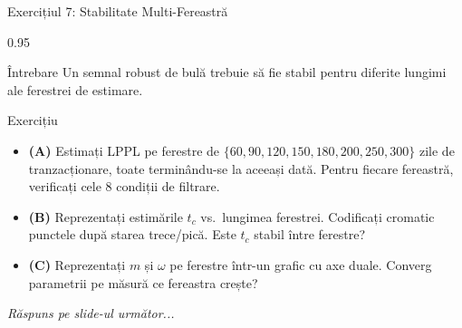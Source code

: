 \documentclass[9pt, aspectratio=169, t]{beamer}
\begin{document}
\begin{frame}{Exercițiul 7: Stabilitate Multi-Fereastră}
    \begin{cminipage}{0.95\textwidth}
    \begin{alertblock}{Întrebare}
        Un semnal robust de bulă trebuie să fie stabil pentru diferite lungimi ale ferestrei de estimare.
    \end{alertblock}

    \vspace{0.2cm}

    \begin{block}{Exercițiu}
        \begin{itemize}\setlength{\itemsep}{3pt}
            \item \textcolor{MainBlue}{\textbf{(A)}} Estimați LPPL pe ferestre de $\{60, 90, 120, 150, 180, 200, 250, 300\}$ zile de tranzacționare, toate terminându-se la aceeași dată. Pentru fiecare fereastră, verificați cele 8 condiții de filtrare.
            \item \textcolor{MainBlue}{\textbf{(B)}} Reprezentați estimările $t_c$ vs.\ lungimea ferestrei. Codificați cromatic punctele după starea trece/pică. Este $t_c$ stabil între ferestre?
            \item \textcolor{MainBlue}{\textbf{(C)}} Reprezentați $m$ și $\omega$ pe ferestre într-un grafic cu axe duale. Converg parametrii pe măsură ce fereastra crește?
        \end{itemize}
    \end{block}

    \vspace{0.2cm}

    \begin{center}
        \textit{Răspuns pe slide-ul următor...}
    \end{center}
    \end{cminipage}
\end{frame}
\end{document}
